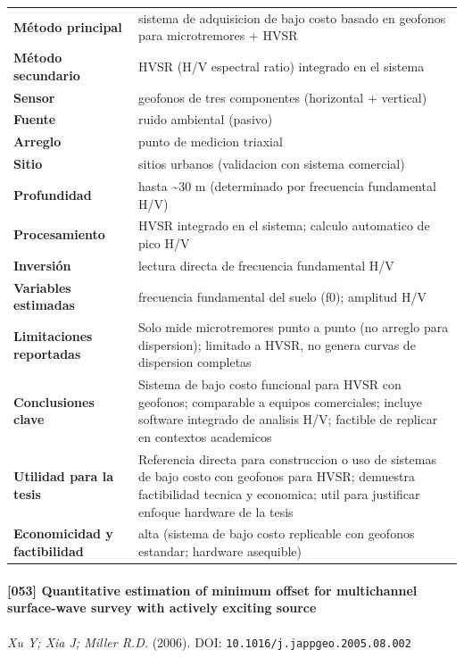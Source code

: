 \begin{center}\scriptsize
\begin{tabularx}{\textwidth}{@{}>{\bfseries}p{3.3cm} X@{}}
\toprule
M\'etodo principal & sistema de adquisicion de bajo costo basado en geofonos para microtremores + HVSR \\
M\'etodo secundario & HVSR (H/V espectral ratio) integrado en el sistema \\
Sensor & geofonos de tres componentes (horizontal + vertical) \\
Fuente & ruido ambiental (pasivo) \\
Arreglo & punto de medicion triaxial \\
Sitio & sitios urbanos (validacion con sistema comercial) \\
Profundidad & hasta \textasciitilde{}30 m (determinado por frecuencia fundamental H/V) \\
Procesamiento & HVSR integrado en el sistema; calculo automatico de pico H/V \\
Inversi\'on & lectura directa de frecuencia fundamental H/V \\
Variables estimadas & frecuencia fundamental del suelo (f0); amplitud H/V \\
Limitaciones reportadas & Solo mide microtremores punto a punto (no arreglo para dispersion); limitado a HVSR, no genera curvas de dispersion completas \\
Conclusiones clave & Sistema de bajo costo funcional para HVSR con geofonos; comparable a equipos comerciales; incluye software integrado de analisis H/V; factible de replicar en contextos academicos \\
Utilidad para la tesis & Referencia directa para construccion o uso de sistemas de bajo costo con geofonos para HVSR; demuestra factibilidad tecnica y economica; util para justificar enfoque hardware de la tesis \\
Economicidad y factibilidad & alta (sistema de bajo costo replicable con geofonos estandar; hardware asequible) \\
\bottomrule
\end{tabularx}
\end{center}

\paragraph{[053] Quantitative estimation of minimum offset for multichannel surface-wave survey with actively exciting source} \emph{Xu Y; Xia J; Miller R.D.} (2006).
{\scriptsize DOI: \texttt{10.1016/j.jappgeo.2005.08.002}}

